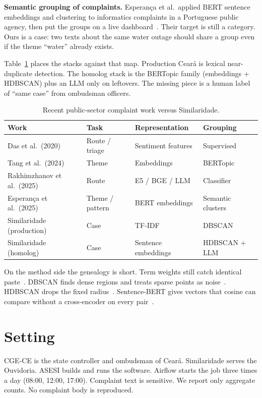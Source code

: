 \documentclass[11pt,a4paper]{article}
\begin{document}
\textbf{Semantic grouping of complaints.}
Esperan\c{c}a et al.\ applied BERT sentence embeddings and clustering to informatics complaints in a Portuguese public agency, then put the groups on a live dashboard~\cite{esperanca2025complaint}. Their target is still a category. Ours is a case: two texts about the same water outage should share a group even if the theme ``water'' already exists.

Table~\ref{tab:sota} places the stacks against that map. Production Cear\'{a} is lexical near-duplicate detection. The homolog stack is the BERTopic family (embeddings + HDBSCAN) plus an LLM only on leftovers. The missing piece is a human label of ``same case'' from ombudsman officers.

\begin{table}[ht]
\centering
\caption{Recent public-sector complaint work versus Similaridade.}
\label{tab:sota}
\small
\begin{tabular}{llll}
\toprule
Work & Task & Representation & Grouping \\
\midrule
Das et al.\ (2020) & Route / triage & Sentiment features & Supervised \\
Tang et al.\ (2024) & Theme & Embeddings & BERTopic \\
Rakhimzhanov et al.\ (2025) & Route & E5 / BGE / LLM & Classifier \\
Esperan\c{c}a et al.\ (2025) & Theme / pattern & BERT embeddings & Semantic clusters \\
Similaridade (production) & Case & TF-IDF & DBSCAN \\
Similaridade (homolog) & Case & Sentence embeddings & HDBSCAN + LLM \\
\bottomrule
\end{tabular}
\end{table}

On the method side the genealogy is short. Term weights still catch identical paste~\cite{salton1988term}. DBSCAN finds dense regions and treats sparse points as noise~\cite{ester1996dbscan}. HDBSCAN drops the fixed radius~\cite{campello2013hdbscan}. Sentence-BERT gives vectors that cosine can compare without a cross-encoder on every pair~\cite{reimers2019sbert}.

\section{Setting}
CGE-CE is the state controller and ombudsman of Cear\'{a}. Similaridade serves the Ouvidoria. ASESI builds and runs the software. Airflow starts the job three times a day (08:00, 12:00, 17:00). Complaint text is sensitive. We report only aggregate counts. No complaint body is reproduced.
\end{document}
